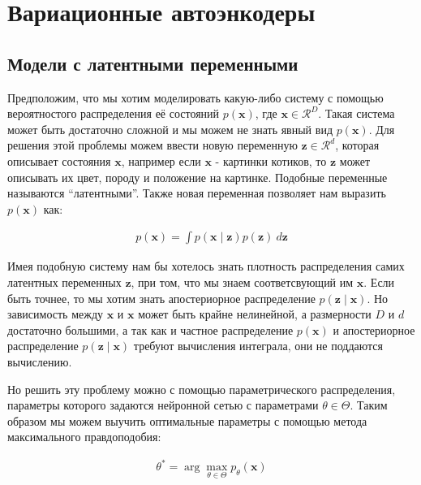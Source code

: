 \documentclass[a4paper]{report}
\begin{document}
\chapter{Вариационные автоэнкодеры}

\section{Модели с латентными переменными}

Предположим, что мы хотим моделировать какую-либо систему с помощью вероятностого распределения её состояний $p(\mathbf{x})$, где
$\mathbf{x} \in \mathcal{R}^D$. Такая система может быть достаточно сложной и мы можем не знать явный вид $p(\mathbf{x})$. Для решения этой проблемы
можем ввести новую переменную $\mathbf{z} \in \mathcal{R}^d$, которая описывает состояния $\mathbf{x}$, например если $\mathbf{x}$ - картинки котиков, то
$\mathbf{z}$ может описывать их цвет, породу и положение на картинке. Подобные переменные называются ``латентными''.
Также новая переменная позволяет нам выразить $p(\mathbf{x})$ как:

\begin{align*}
    p(\mathbf{x}) = \int p(\mathbf{x} \mid \mathbf{z}) p(\mathbf{z}) ~d\mathbf{z}
    \tag{1}
\end{align*}

Имея подобную систему нам бы хотелось знать плотность распределения самих латентных переменных $\mathbf{z}$, при том, что мы знаем соответсвующий
им $\mathbf{x}$. Если быть точнее, то мы хотим знать апостериорное распределение $p(\mathbf{z} \mid \mathbf{x})$. Но зависимость между $\mathbf{x}$ и
$\mathbf{x}$ может быть крайне нелинейной, а размерности $D$ и $d$ достаточно большими, а так как и частное распределение $p(\mathbf{x})$ и апостериорное
распределение $p(\mathbf{z} \mid \mathbf{x})$ требуют вычисления интеграла, они не поддаются вычислению.

Но решить эту проблему можно с помощью параметрического распределения, параметры которого задаются нейронной сетью с параметрами $\theta \in \Theta$.
Таким образом мы можем выучить оптимальные параметры с помощью метода максимального правдоподобия:

\begin{align*}
   \theta^* = \arg \max_{\theta \in \Theta} p_\theta(\mathbf{x}) 
   \tag{2}
\end{align*}
\end{document}
